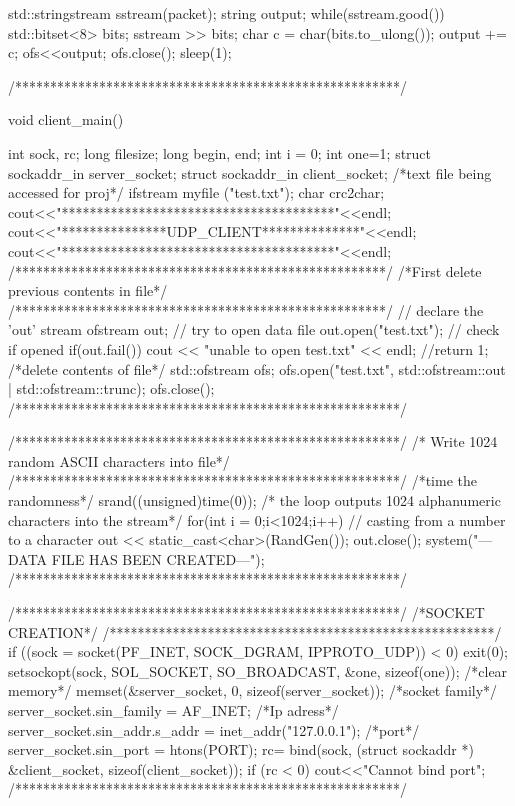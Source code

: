 \documentclass{article}
\begin{document}
\begin{titlepage}
{{{{    				std::stringstream sstream(packet);
    				string output;
    				while(sstream.good())
    				{
        				std::bitset<8> bits;
        				sstream >> bits;
        				char c = char(bits.to_ulong());
        				output += c;
    				}
				ofs<<output;
				ofs.close();
				sleep(1);
				
			}
		}
	/*******************************************************/
	}
}

void client_main()
{
	int sock, rc;
	long filesize;
	long begin, end;
	int i = 0;
	int one=1;
	struct sockaddr_in server_socket;
	struct sockaddr_in client_socket;
	/*text file being accessed for proj*/
	ifstream myfile ("test.txt");	
	char crc2char;
	cout<<"***************************************"<<endl;
	cout<<"***************UDP_CLIENT**************"<<endl;
	cout<<"***************************************"<<endl;
	/*****************************************************/
	/*First delete previous contents in file*/
	/*****************************************************/
	// declare the 'out' stream
	ofstream out;    
	// try to open data file
    	out.open("test.txt");  
     	// check if opened
    	if(out.fail())              
    	{ 
		cout << "unable to open test.txt" << endl;
		//return 1; 
    	} 
    	/*delete contents of file*/
    	std::ofstream ofs;
	ofs.open("test.txt", std::ofstream::out | std::ofstream::trunc);
	ofs.close();
	/*******************************************************/
	
	/*******************************************************/
	/* Write 1024 random ASCII characters into file*/
	/*******************************************************/
	/*time the randomness*/
    	srand((unsigned)time(0));
    	/* the loop outputs 1024 
    	alphanumeric characters
    	 into the stream*/
	for(int i = 0;i<1024;i++)   
    	{
	// casting from a number to a character
        	out << static_cast<char>(RandGen());           
    	}
    	out.close();
    	system("---DATA FILE HAS BEEN CREATED---\n");
    	/*******************************************************/
    	
    	/*******************************************************/
    	/*SOCKET CREATION*/
    	/*******************************************************/
	if ((sock = socket(PF_INET, SOCK_DGRAM, IPPROTO_UDP)) < 0)
	{
		exit(0);
	}
	setsockopt(sock, SOL_SOCKET, SO_BROADCAST, &one, sizeof(one));
	/*clear memory*/
	memset(&server_socket, 0, sizeof(server_socket));
	/*socket family*/
	server_socket.sin_family = AF_INET;
	/*Ip adress*/
	server_socket.sin_addr.s_addr = inet_addr("127.0.0.1");
	/*port*/
	server_socket.sin_port = htons(PORT);
	rc= bind(sock, (struct sockaddr *) &client_socket, sizeof(client_socket));
	if (rc < 0) 
	{
		cout<<"Cannot bind port\n";
	}
	/*******************************************************/
	
}
\end{titlepage}
\end{document}
